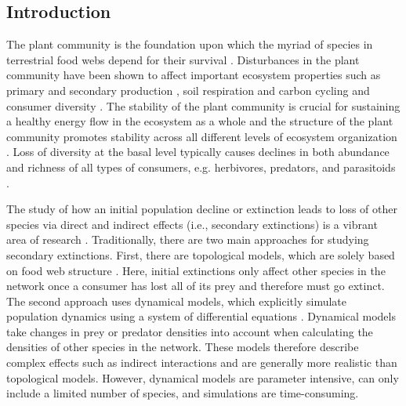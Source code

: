\documentclass[12pt]{article}
\begin{document}
\begin{spacing}{2.0}
\section*{Introduction}

     The plant community is the foundation upon which the myriad of species in terrestrial food webs depend for their survival \citep{}. Disturbances in the plant community have been shown to affect important ecosystem properties such as primary \citep{} and secondary production \citep{borer2012plant}, soil respiration and carbon cycling \citep{chen2019plant} and consumer diversity \citep{scherber2010bottom, Baiser2016}. The stability of the plant community is crucial for sustaining a healthy energy flow in the ecosystem as a whole \citep{Rosenblatt2016} and the structure of the plant community promotes stability across all different levels of ecosystem organization \citep{proulx2010diversity,scherber2010bottom}. Loss of diversity at the basal level typically causes declines in both abundance and richness of all types of consumers, e.g. herbivores, predators, and parasitoids \citep{scherber2010bottom}.
    
    The study of how an initial population decline or extinction leads to loss of other species via direct and indirect effects (i.e., secondary extinctions) is a vibrant area of research \citep{curtsdotter2011robustness, dunne2009cascading, Eklof2006}. Traditionally, there are two main approaches for studying secondary extinctions. First, there are topological models, which are solely based on food web structure \citep{dunne2009cascading}. Here, initial extinctions only affect other species in the network once a consumer has lost all of its prey and therefore must go extinct. The second approach uses dynamical models, which explicitly simulate population dynamics using a system of differential equations \citep{binzer2011susceptibility}. Dynamical models take changes in prey or predator densities into account when calculating the densities of other species in the network. These models therefore describe complex effects such as indirect interactions and are generally more realistic than topological models. However, dynamical models are parameter intensive, can only include a limited number of species, and simulations are time-consuming. 
    

\end{spacing}
\end{document}

